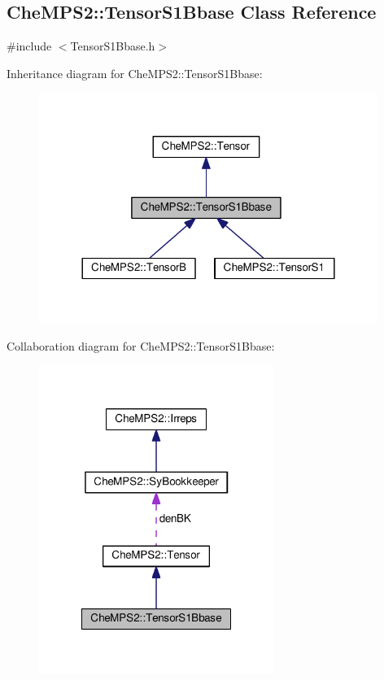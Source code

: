 \hypertarget{classCheMPS2_1_1TensorS1Bbase}{\subsection{Che\-M\-P\-S2\-:\-:Tensor\-S1\-Bbase Class Reference}
\label{classCheMPS2_1_1TensorS1Bbase}
}


{\ttfamily \#include $<$Tensor\-S1\-Bbase.\-h$>$}



Inheritance diagram for Che\-M\-P\-S2\-:\-:Tensor\-S1\-Bbase\-:\nopagebreak
\begin{figure}[H]
\begin{center}
\leavevmode
\includegraphics[width=312pt]{classCheMPS2_1_1TensorS1Bbase__inherit__graph}
\end{center}
\end{figure}


Collaboration diagram for Che\-M\-P\-S2\-:\-:Tensor\-S1\-Bbase\-:\nopagebreak
\begin{figure}[H]
\begin{center}
\leavevmode
\includegraphics[width=216pt]{classCheMPS2_1_1TensorS1Bbase__coll__graph}
\end{center}
\end{figure}
